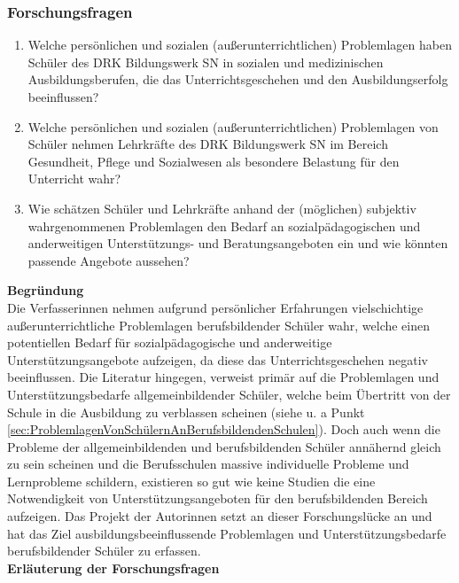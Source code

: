 \subsubsection{Forschungsfragen}
\label{sec:Forschungsfragen}

\begin{enumerate}
	\item Welche persönlichen und sozialen (außerunterrichtlichen) Problemlagen haben Schüler des DRK Bildungswerk SN in sozialen und medizinischen Ausbildungsberufen, die das Unterrichtsgeschehen und den Ausbildungserfolg beeinflussen?
	\item Welche persönlichen und sozialen (außerunterrichtlichen) Problemlagen von Schüler nehmen Lehrkräfte des DRK Bildungswerk SN im Bereich Gesundheit, Pflege und Sozialwesen als besondere Belastung für den Unterricht wahr?
	\item Wie schätzen Schüler und Lehrkräfte anhand der (möglichen) subjektiv wahrgenommenen Problemlagen den Bedarf an sozialpädagogischen und anderweitigen Unterstützungs- und Beratungsangeboten ein und wie könnten passende Angebote aussehen?
\end{enumerate}

\noindent
\textbf{Begründung}\\

\noindent
Die Verfasserinnen nehmen aufgrund persönlicher Erfahrungen vielschichtige außerunterrichtliche Problemlagen berufsbildender Schüler wahr, welche einen potentiellen Bedarf für sozialpädagogische und anderweitige Unterstützungsangebote aufzeigen, da diese das Unterrichtsgeschehen negativ beeinflussen. Die Literatur hingegen, verweist primär auf die Problemlagen und Unterstützungsbedarfe allgemeinbildender Schüler, welche beim Übertritt von der Schule in die Ausbildung zu verblassen scheinen (siehe u. a Punkt \ref{sec:ProblemlagenVonSchülernAnBerufsbildendenSchulen}). Doch auch wenn die Probleme der allgemeinbildenden und berufsbildenden Schüler annähernd gleich zu sein scheinen und die Berufsschulen massive individuelle Probleme und Lernprobleme schildern, existieren so gut wie keine Studien die eine Notwendigkeit von Unterstützungsangeboten für den berufsbildenden Bereich aufzeigen. Das Projekt der Autorinnen setzt an dieser Forschungslücke an und hat das Ziel ausbildungsbeeinflussende Problemlagen und Unterstützungsbedarfe berufsbildender Schüler zu erfassen.\\

\newpage
\noindent
\textbf{Erläuterung der Forschungsfragen}\\

